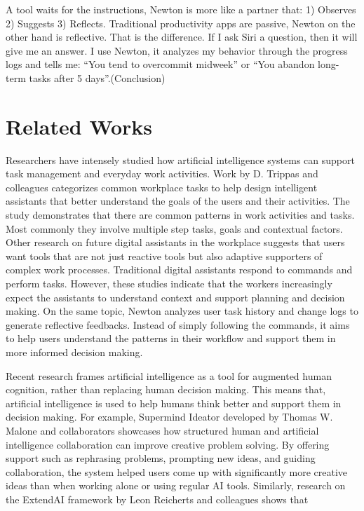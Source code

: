 \documentclass[12pt]{article}
\begin{document}
A tool waits for the instructions, Newton is more like a partner that: 1) Observes 2) Suggests 3) Reflects. Traditional productivity
 apps are passive, Newton on the other hand is reflective. That is the difference. If I ask Siri a question, then it will give me 
 an answer. I use Newton, it analyzes my behavior through the progress logs and tells me: “You tend to overcommit midweek” or “You
  abandon long-term tasks after 5 days”.(Conclusion)





\section{Related Works}
Researchers have intensely studied how artificial intelligence systems can support task management and everyday work activities. 
Work by D. Trippas 
and colleagues \cite{10.1145/3295750.3298934} categorizes common workplace tasks to help design intelligent assistants that better 
understand the goals of the users and their activities. The study demonstrates that there are common patterns in work activities and
 tasks. Most commonly they involve multiple step tasks, goals and contextual factors.
Other research \cite{KHAOKAEW2022102905} on future digital assistants in the workplace suggests that users want tools that are not
 just reactive tools but also adaptive supporters of complex work processes.
Traditional digital assistants respond to commands and perform tasks. However, these studies indicate that the workers increasingly
 expect the assistants to understand context and support planning and decision making. On the same topic, Newton analyzes user task
  history and change logs to generate reflective feedbacks. Instead of simply following the commands, it aims to help users 
  understand the patterns in their workflow and support them in more informed decision making.

Recent research frames artificial intelligence as a tool for augmented human cognition, rather than replacing human decision making.
 This means that, artificial intelligence is used to help humans think better and support them in decision making.
  For example, Supermind Ideator developed by Thomas W. Malone and collaborators \cite{10.1145/3643562.3672611} showcases how 
structured human and artificial intelligence collaboration can improve creative problem solving. By offering support such as 
rephrasing problems, prompting new ideas, and guiding collaboration, the system helped users come up with significantly more
 creative ideas than when working alone or using regular AI tools. Similarly, research on the ExtendAI framework by Leon Reicherts 
 and colleagues \cite{10.1145/3706598.3713295} shows that 
\end{document}

